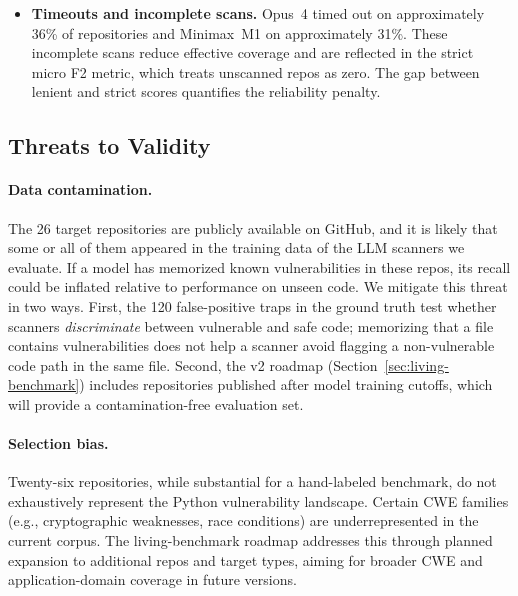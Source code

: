 \begin{itemize}
  \item \textbf{Timeouts and incomplete scans.}
    Opus~4 timed out on approximately 36\% of repositories and
    Minimax~M1 on approximately 31\%.  These incomplete scans reduce
    effective coverage and are reflected in the strict micro F2 metric,
    which treats unscanned repos as zero.  The gap between lenient and
    strict scores quantifies the reliability penalty.
\end{itemize}

\subsection{Threats to Validity}
\label{sec:threats}

\paragraph{Data contamination.}
The 26 target repositories are publicly available on GitHub, and it is
likely that some or all of them appeared in the training data of the LLM
scanners we evaluate.  If a model has memorized known vulnerabilities in
these repos, its recall could be inflated relative to performance on
unseen code.  We mitigate this threat in two ways.  First, the 120
false-positive traps in the ground truth test whether scanners
\emph{discriminate} between vulnerable and safe code; memorizing that a
file contains vulnerabilities does not help a scanner avoid flagging a
non-vulnerable code path in the same file.  Second, the v2 roadmap
(Section~\ref{sec:living-benchmark}) includes repositories published
after model training cutoffs, which will provide a contamination-free
evaluation set.

\paragraph{Selection bias.}
Twenty-six repositories, while substantial for a hand-labeled benchmark,
do not exhaustively represent the Python vulnerability landscape.
Certain CWE families (e.g., cryptographic weaknesses, race conditions)
are underrepresented in the current corpus.  The living-benchmark
roadmap addresses this through planned expansion to additional repos
and target types, aiming for broader CWE and application-domain
coverage in future versions.
